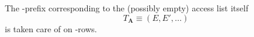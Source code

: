 \begin{description}
\end{description}

\saNote{}
The \rlp{}-prefix corresponding to the (possibly empty) access list itself
\[
    T_\mathbf{A} \equiv (E, E', \dots)
\]
is taken care of on \locAccessListPrefix{}-rows.
